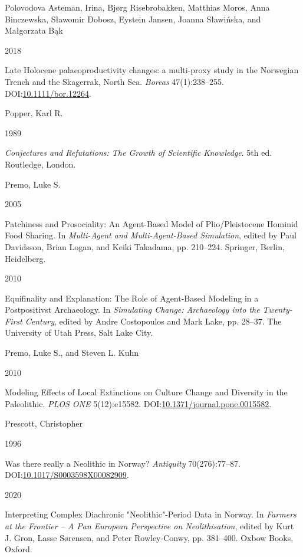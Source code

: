 \documentclass[
  12pt,
  a4paper,
  oneside]{book}
\newlength{\cslhangindent}
\newlength{\csllabelwidth}
\newlength{\cslentryspacingunit} %
\newenvironment{CSLReferences}[2] %
 {%
  \setlength{\parindent}{0pt}
  \ifodd #1
  \let\oldpar\par
  \def\par{\hangindent=\cslhangindent\oldpar}
  \fi
  \setlength{\parskip}{#2\cslentryspacingunit}
 }%
 {}
\newcommand{\CSLBlock}[1]{#1\hfill\break}
\newcommand{\CSLLeftMargin}[1]{\parbox[t]{\csllabelwidth}{#1}}
\newcommand{\CSLRightInline}[1]{\parbox[t]{\linewidth - \csllabelwidth}{#1}\break}
\begin{document}
\begin{CSLReferences}{0}{0}
\leavevmode{}%
\CSLBlock{Polovodova Asteman, Irina, Bjørg Risebrobakken, Matthias Moros, Anna Binczewska, Sławomir Dobosz, Eystein Jansen, Joanna Sławińska, and Małgorzata Bąk}
\CSLLeftMargin{ 2018}
\CSLRightInline{{Late Holocene palaeoproductivity changes: a multi-proxy study in the Norwegian Trench and the Skagerrak, North Sea}. \emph{Boreas} 47(1):238--255. DOI:\href{https://doi.org/10.1111/bor.12264}{10.1111/bor.12264}.}

\leavevmode{}%
\CSLBlock{Popper, Karl R.}
\CSLLeftMargin{ 1989}
\CSLRightInline{\emph{{Conjectures and Refutations: The Growth of Scientific Knowledge}}. 5th ed. Routledge, London.}

\leavevmode{}%
\CSLBlock{Premo, Luke S.}
\CSLLeftMargin{ 2005}
\CSLRightInline{{Patchiness and Prosociality: An Agent-Based Model of Plio/Pleistocene Hominid Food Sharing}. In \emph{{Multi-Agent and Multi-Agent-Based Simulation}}, edited by Paul Davidsson, Brian Logan, and Keiki Takadama, pp. 210--224. Springer, Berlin, Heidelberg.}

\leavevmode{}%
\CSLLeftMargin{ 2010 }
\CSLRightInline{{Equifinality and Explanation: The Role of Agent-Based Modeling in a Postpositivst Archaeology}. In \emph{{Simulating Change: Archaeology into the Twenty-First Century}}, edited by Andre Costopoulos and Mark Lake, pp. 28--37. The University of Utah Press, Salt Lake City.}

\leavevmode{}%
\CSLBlock{Premo, Luke S., and Steven L. Kuhn}
\CSLLeftMargin{ 2010}
\CSLRightInline{{Modeling Effects of Local Extinctions on Culture Change and Diversity in the Paleolithic}. \emph{PLOS ONE} 5(12):e15582. DOI:\href{https://doi.org/10.1371/journal.pone.0015582}{10.1371/journal.pone.0015582}.}

\leavevmode{}%
\CSLBlock{Prescott, Christopher}
\CSLLeftMargin{ 1996}
\CSLRightInline{{Was there really a Neolithic in Norway?} \emph{Antiquity} 70(276):77--87. DOI:\href{https://doi.org/10.1017/S0003598X00082909}{10.1017/S0003598X00082909}.}

\leavevmode{}%
\CSLLeftMargin{ 2020 }
\CSLRightInline{{Interpreting Complex Diachronic {"}Neolithic{"}-Period Data in Norway}. In \emph{{Farmers at the Frontier -- A Pan European Perspective on Neolithisation}}, edited by Kurt J. Gron, Lasse Sørensen, and Peter Rowley-Conwy, pp. 381--400. Oxbow Books, Oxford.}


\end{CSLReferences}
\end{document}
